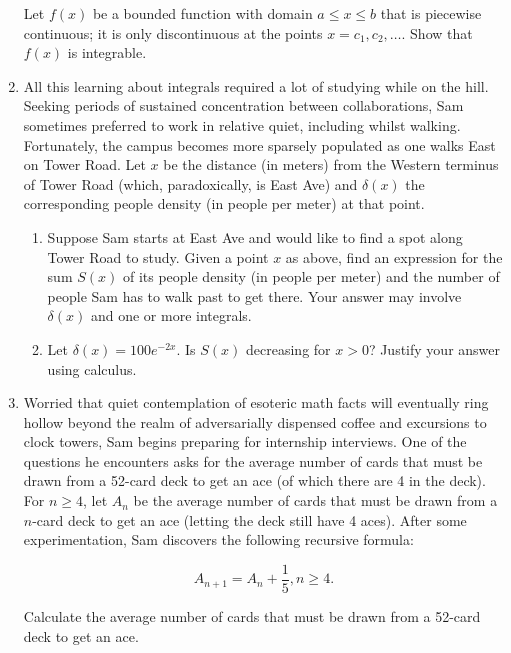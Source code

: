 \documentclass{article}
\begin{document}
\begin{enumerate}
Let $f(x)$ be a bounded function with domain $a \leq x \leq b$ that is piecewise continuous; it is only discontinuous at the points $x = c_1,c_2,\dots$. Show that $f(x)$ is integrable.

\vfill 

\newpage

\item All this learning about integrals required a lot of studying while on the hill. Seeking periods of sustained concentration between collaborations, Sam sometimes preferred to work in relative quiet, including whilst walking. Fortunately, the campus becomes more sparsely populated as one walks East on Tower Road. Let $x$ be the distance (in meters) from the Western terminus of Tower Road (which, paradoxically, is East Ave) and $\delta(x)$ the corresponding people density (in people per meter) at that point.

\begin{enumerate}
    \item Suppose Sam starts at East Ave and would like to find a spot along Tower Road to study. Given a point $x$ as above, find an expression for the sum $S(x)$ of its people density (in people per meter) and the number of people Sam has to walk past to get there. Your answer may involve $\delta(x)$ and one or more integrals. 

    \vfill

    \item Let $\delta(x) = 100e^{-2x}$. Is $S(x)$ decreasing for $x > 0$? Justify your answer using calculus.   

    \vfill 
\end{enumerate}

\item Worried that quiet contemplation of esoteric math facts will eventually ring hollow beyond the realm of adversarially dispensed coffee and excursions to clock towers, Sam begins preparing for internship interviews. One of the questions he encounters asks for the average number of cards that must be drawn from a 52-card deck to get an ace (of which there are 4 in the deck). For $n \geq 4$, let $A_n$ be the average number of cards that must be drawn from a $n$-card deck to get an ace (letting the deck still have 4 aces). After some experimentation, Sam discovers the following recursive formula:

$$A_{n+1} = A_n + \frac{1}{5}, n \geq 4.$$

Calculate the average number of cards that must be drawn from a 52-card deck to get an ace. 

\vfill

\end{enumerate}
\end{document}
